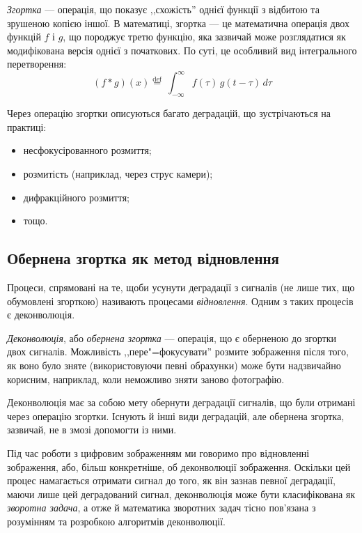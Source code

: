 \documentclass[simple,14pt,utf8,ukrainian]{eskdtext}
\begin{document}
  \emph{Згортка} --- операція, що показує ,,схожість'' однієї функції з
  відбитою та зрушеною копією іншої.
  В математиці, згортка --- це математична операція двох функцій $f$ і $g$, що
  породжує третю функцію, яка зазвичай може розглядатися як модифікована
  версія однієї з початкових.
  По суті, це особливий вид інтегрального перетворення:
  \[
    \left( f * g \right)\left( x \right) \stackrel{\mathrm{def}}{=}\
    \int_{-\infty}^\infty f(\tau)\, g(t - \tau)\, d\tau
  \]

  Через операцію згортки описуються багато деградацій, що зустрічаються на
  практиці:
  \begin{itemize}
    \item несфокусірованного розмиття;
    \item розмитість (наприклад, через струс камери);
    \item дифракційного розмиття;
    \item тощо.
  \end{itemize}
  \clearpage

\subsection{Обернена згортка як метод відновлення}

  Процеси, спрямовані на те, щоби усунути деградації з сигналів (не лише тих,
  що обумовлені згорткою) називають процесами \emph{відновлення}.
  Одним з таких процесів є деконволюція.

  \emph{Деконволюція}, або \emph{обернена згортка} --- операція, що є
  оберненою до згортки двох сигналів.
  Можливість ,,пере"=фокусувати'' розмите зображення після того, як воно було
  зняте (використовуючи певні обрахунки) може бути надзвичайно корисним,
  наприклад, коли неможливо зняти заново фотографію.

  Деконволюція має за собою мету обернути деградації сигналів, що були
  отримані через операцію згортки.
  Існують й інші види деградацій, але обернена згортка, зазвичай, не в змозі
  допомогти із ними.

  Під час роботи з цифровим зображенням ми говоримо про відновленні зображення,
  або, більш конкретніше, об деконволюції зображення.
  Оскільки цей процес намагається отримати сигнал до того, як він зазнав
  певної деградації, маючи лише цей деградований сигнал, деконволюція може
  бути класифікована як \emph{зворотна задача}, а отже й математика зворотних
  задач тісно пов’язана з розумінням та розробкою алгоритмів деконволюції.
\end{document}
